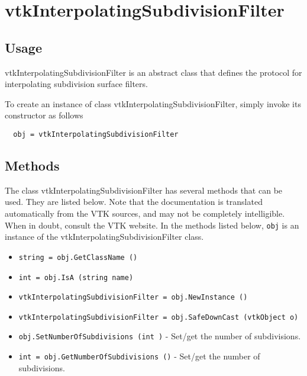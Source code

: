 \section{vtkInterpolatingSubdivisionFilter}

\subsection{Usage}

 vtkInterpolatingSubdivisionFilter is an abstract class that defines
 the protocol for interpolating subdivision surface filters.

To create an instance of class vtkInterpolatingSubdivisionFilter, simply
invoke its constructor as follows
\begin{verbatim}
  obj = vtkInterpolatingSubdivisionFilter
\end{verbatim}
\subsection{Methods}

The class vtkInterpolatingSubdivisionFilter has several methods that can be used.
  They are listed below.
Note that the documentation is translated automatically from the VTK sources,
and may not be completely intelligible.  When in doubt, consult the VTK website.
In the methods listed below, \verb|obj| is an instance of the vtkInterpolatingSubdivisionFilter class.
\begin{itemize}
\item  \verb|string = obj.GetClassName ()|

\item  \verb|int = obj.IsA (string name)|

\item  \verb|vtkInterpolatingSubdivisionFilter = obj.NewInstance ()|

\item  \verb|vtkInterpolatingSubdivisionFilter = obj.SafeDownCast (vtkObject o)|

\item  \verb|obj.SetNumberOfSubdivisions (int )| -  Set/get the number of subdivisions.

\item  \verb|int = obj.GetNumberOfSubdivisions ()| -  Set/get the number of subdivisions.

\end{itemize}

